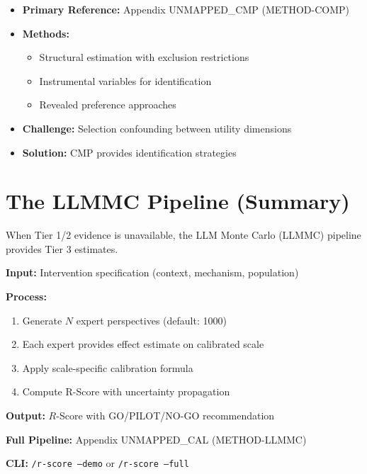 \begin{itemize}[nosep]
    \item \textbf{Primary Reference:} Appendix UNMAPPED_CMP (METHOD-COMP)
    \item \textbf{Methods:}
        \begin{itemize}[nosep]
            \item Structural estimation with exclusion restrictions
            \item Instrumental variables for identification
            \item Revealed preference approaches
        \end{itemize}
    \item \textbf{Challenge:} Selection confounding between utility dimensions
    \item \textbf{Solution:} CMP provides identification strategies
\end{itemize}


\section{The LLMMC Pipeline (Summary)}
\label{sec:pm-llmmc}

When Tier 1/2 evidence is unavailable, the LLM Monte Carlo (LLMMC) pipeline provides Tier 3 estimates.

\begin{tcolorbox}[colback=blue!5!white, colframe=blue!75!black, title=LLMMC Pipeline Overview]
\textbf{Input:} Intervention specification (context, mechanism, population)

\textbf{Process:}
\begin{enumerate}[nosep]
    \item Generate $N$ expert perspectives (default: 1000)
    \item Each expert provides effect estimate on calibrated scale
    \item Apply scale-specific calibration formula
    \item Compute R-Score with uncertainty propagation
\end{enumerate}

\textbf{Output:} $R$-Score with GO/PILOT/NO-GO recommendation

\textbf{Full Pipeline:} Appendix UNMAPPED_CAL (METHOD-LLMMC)

\textbf{CLI:} \texttt{/r-score --demo} or \texttt{/r-score --full}
\end{tcolorbox}

